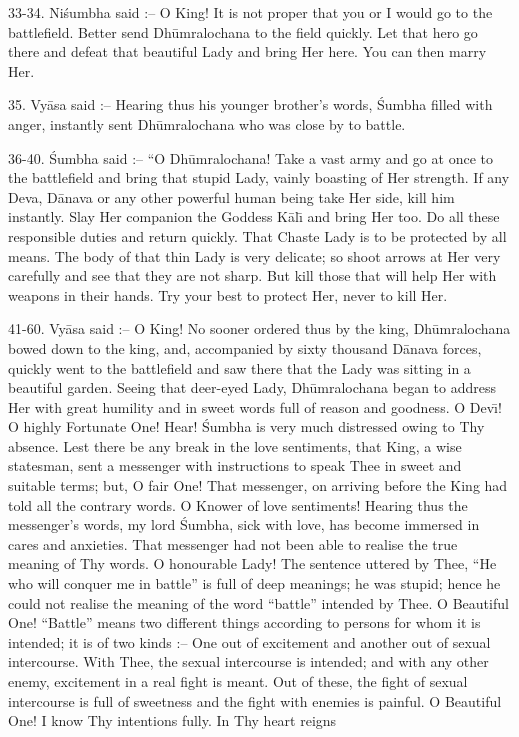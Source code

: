 33-34. Ni\'sumbha said :-- O King! It is not proper that you or I would go to the battlefield. Better send Dh\=umralochana to the field quickly. Let that hero go there and defeat that beautiful Lady and bring Her here. You can then marry Her.

35. Vy\=asa said :-- Hearing thus his younger brother's words, \'Sumbha filled with anger, instantly sent Dh\=umralochana who was close by to battle.

36-40. \'Sumbha said :-- ``O Dh\=umralochana! Take a vast army and go at once to the battlefield and bring that stupid Lady, vainly boasting of Her strength. If any Deva, D\=anava or any other powerful human being take Her side, kill him instantly. Slay Her companion the Goddess K\=al\={\i} and bring Her too. Do all these responsible duties and return quickly. That Chaste Lady is to be protected by all means. The body of that thin Lady is very delicate; so shoot arrows at Her very carefully and see that they are not sharp. But kill those that will help Her with weapons in their hands. Try your best to protect Her, never to kill Her.

41-60. Vy\=asa said :-- O King! No sooner ordered thus by the king, Dh\=umralochana bowed down to the king, and, accompanied by sixty thousand D\=anava forces, quickly went to the battlefield and saw there that the Lady was sitting in a beautiful garden. Seeing that deer-eyed Lady, Dh\=umralochana began to address Her with great humility and in sweet words full of reason and goodness. O Dev\={\i}! O highly Fortunate One! Hear! \'Sumbha is very much distressed owing to Thy absence. Lest there be any break in the love sentiments, that King, a wise statesman, sent a messenger with instructions to speak Thee in sweet and suitable terms; but, O fair One! That messenger, on arriving before the King had told all the contrary words. O Knower of love sentiments! Hearing thus the messenger's words, my lord \'Sumbha, sick with love, has become immersed in cares and anxieties. That messenger had not been able to realise the true meaning of Thy words. O honourable Lady! The sentence uttered by Thee, ``He who will conquer me in battle'' is full of deep meanings; he was stupid; hence he could not realise the meaning of the word ``battle'' intended by Thee. O Beautiful One! ``Battle'' means two different things according to persons for whom it is intended; it is of two kinds :-- One out of excitement and another out of sexual intercourse. With Thee, the sexual intercourse is intended; and with any other enemy, excitement in a real fight is meant. Out of these, the fight of sexual intercourse is full of sweetness and the fight with enemies is painful. O Beautiful One! I know Thy intentions fully. In Thy heart reigns

